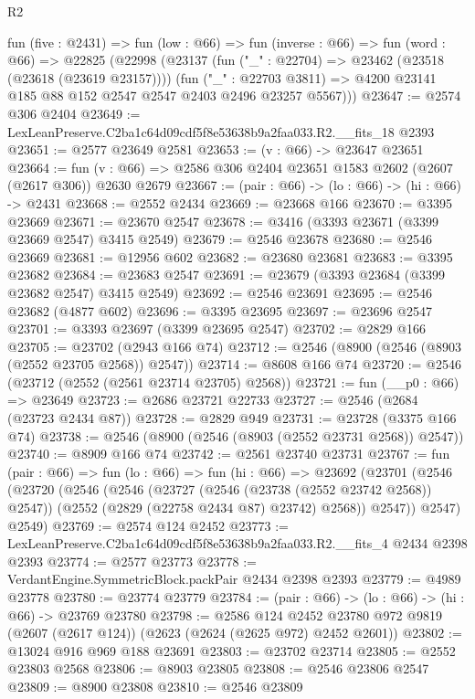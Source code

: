 \begin{lexlean}{R2}
\begin{coremodule}
  fun (five : @2431) =>
  fun (low : @66) =>
  fun (inverse : @66) =>
  fun (word : @66) =>
  @22825
    (@22998
      (@23137
        (fun ("_" : @22704) => @23462 (@23518 (@23618 (@23619 @23157))))
        (fun ("_" : @22703 @3811) =>
        @4200 @23141 @185 @88 @152 @2547 @2547 @2403 @2496 @23257 @5567)))
@23647 := @2574 @306 @2404
@23649 := LexLeanPreserve.C2ba1c64d09cdf5f8e53638b9a2faa033.R2.__fits_18 @2393
@23651 := @2577 @23649 @2581
@23653 := (v : @66) -> @23647 @23651
@23664 := fun (v : @66) => @2586 @306 @2404 @23651 @1583 @2602 (@2607 (@2617 @306)) @2630 @2679
@23667 := (pair : @66) -> (lo : @66) -> (hi : @66) -> @2431
@23668 := @2552 @2434
@23669 := @23668 @166
@23670 := @3395 @23669
@23671 := @23670 @2547
@23678 := @3416 (@3393 @23671 (@3399 @23669 @2547) @3415 @2549)
@23679 := @2546 @23678
@23680 := @2546 @23669
@23681 := @12956 @602
@23682 := @23680 @23681
@23683 := @3395 @23682
@23684 := @23683 @2547
@23691 := @23679 (@3393 @23684 (@3399 @23682 @2547) @3415 @2549)
@23692 := @2546 @23691
@23695 := @2546 @23682 (@4877 @602)
@23696 := @3395 @23695
@23697 := @23696 @2547
@23701 := @3393 @23697 (@3399 @23695 @2547)
@23702 := @2829 @166
@23705 := @23702 (@2943 @166 @74)
@23712 := @2546 (@8900 (@2546 (@8903 (@2552 @23705 @2568)) @2547))
@23714 := @8608 @166 @74
@23720 := @2546 (@23712 (@2552 (@2561 @23714 @23705) @2568))
@23721 := fun (__p0 : @66) => @23649
@23723 := @2686 @23721 @22733
@23727 := @2546 (@2684 (@23723 @2434 @87))
@23728 := @2829 @949
@23731 := @23728 (@3375 @166 @74)
@23738 := @2546 (@8900 (@2546 (@8903 (@2552 @23731 @2568)) @2547))
@23740 := @8909 @166 @74
@23742 := @2561 @23740 @23731
@23767 := fun (pair : @66) =>
  fun (lo : @66) =>
  fun (hi : @66) =>
  @23692
    (@23701
      (@2546
        (@23720
          (@2546
            (@2546
              (@23727 (@2546 (@23738 (@2552 @23742 @2568)) @2547))
              (@2552 (@2829 (@22758 @2434 @87) @23742) @2568))
            @2547))
        @2547)
      @2549)
@23769 := @2574 @124 @2452
@23773 := LexLeanPreserve.C2ba1c64d09cdf5f8e53638b9a2faa033.R2.__fits_4 @2434 @2398 @2393
@23774 := @2577 @23773
@23778 := VerdantEngine.SymmetricBlock.packPair @2434 @2398 @2393
@23779 := @4989 @23778
@23780 := @23774 @23779
@23784 := (pair : @66) -> (lo : @66) -> (hi : @66) -> @23769 @23780
@23798 := @2586
    @124
    @2452
    @23780
    @972
    @9819
    (@2607 (@2617 @124))
    (@2623 (@2624 (@2625 @972) @2452 @2601))
@23802 := @13024 @916 @969 @188 @23691
@23803 := @23702 @23714
@23805 := @2552 @23803 @2568
@23806 := @8903 @23805
@23808 := @2546 @23806 @2547
@23809 := @8900 @23808
@23810 := @2546 @23809

\end{coremodule}
\end{lexlean}
